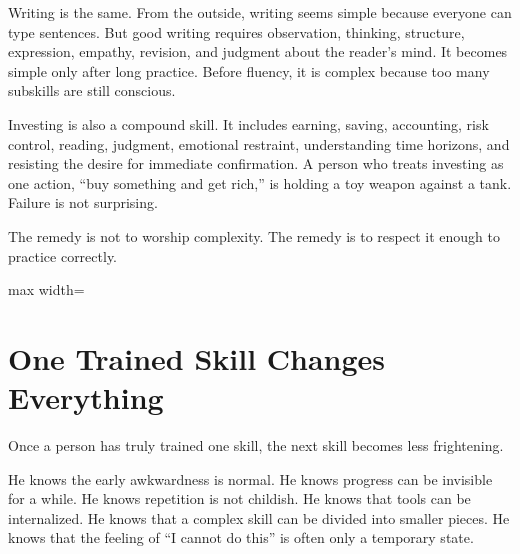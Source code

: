 Writing is the same. From the outside, writing seems simple because everyone can type sentences. But good writing requires observation, thinking, structure, expression, empathy, revision, and judgment about the reader's mind. It becomes simple only after long practice. Before fluency, it is complex because too many subskills are still conscious.

Investing is also a compound skill. It includes earning, saving, accounting, risk control, reading, judgment, emotional restraint, understanding time horizons, and resisting the desire for immediate confirmation. A person who treats investing as one action, ``buy something and get rich,'' is holding a toy weapon against a tank. Failure is not surprising.

The remedy is not to worship complexity. The remedy is to respect it enough to practice correctly.

\begin{center}
\begin{adjustbox}{max width=\linewidth}
\end{adjustbox}
\end{center}

\section*{One Trained Skill Changes Everything}

Once a person has truly trained one skill, the next skill becomes less frightening.

He knows the early awkwardness is normal. He knows progress can be invisible for a while. He knows repetition is not childish. He knows that tools can be internalized. He knows that a complex skill can be divided into smaller pieces. He knows that the feeling of ``I cannot do this'' is often only a temporary state.

